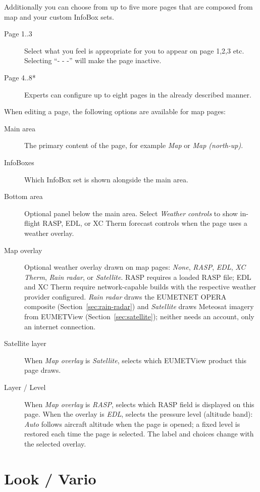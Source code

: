 Additionally you can choose from up to five more pages that are composed from map 
and your custom InfoBox sets.  

\begin{description}
\item[Page 1..3]  Select what you feel is appropriate for you to appear on page 1,2,3 etc. 
  Selecting ``- - -'' will make the page inactive.
\item[Page 4..8*]  Experts can configure up to eight pages in the already 
  described manner.
\end{description}

When editing a page, the following options are available for map pages:
\begin{description}
\item[Main area]  The primary content of the page, for example \emph{Map}
  or \emph{Map (north-up)}.
\item[InfoBoxes]  Which InfoBox set is shown alongside the main area.
\item[Bottom area]  Optional panel below the main area.  Select
  \emph{Weather controls} to show in-flight RASP, EDL, or XC Therm forecast
  controls when the page uses a weather overlay.
\item[Map overlay]  Optional weather overlay drawn on map pages: \emph{None},
  \emph{RASP}, \emph{EDL}, \emph{XC Therm}, \emph{Rain radar}, or
  \emph{Satellite}.  RASP requires a loaded RASP file; EDL and XC Therm
  require network-capable builds with the respective weather provider
  configured.  \emph{Rain radar} draws the EUMETNET OPERA composite
  (Section~\ref{sec:rain-radar}) and \emph{Satellite} draws Meteosat
  imagery from EUMETView (Section~\ref{sec:satellite}); neither needs an
  account, only an internet connection.
\item[Satellite layer]  When \emph{Map overlay} is \emph{Satellite},
  selects which EUMETView product this page draws.
\item[Layer / Level]  When \emph{Map overlay} is \emph{RASP}, selects
  which RASP field is displayed on this page.  When the overlay is
  \emph{EDL}, selects the pressure level (altitude band): \emph{Auto}
  follows aircraft altitude when the page is opened; a fixed level is
  restored each time the page is selected.  The label and choices
  change with the selected overlay.
\end{description}


\section{Look / Vario}\label{sec:vario-gauge}

